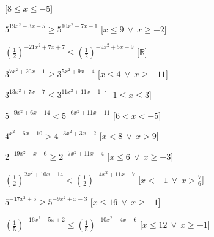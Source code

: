 \begin{esercizio}
\begin{enumeratea}
   \hfill [\(8 \leqslant x \leqslant -5\)]
  \item  \(5^{19 x^2 -3 x -5} \geqslant 5^{10 x^2 -7 x -1}\)
   \hfill [\(x \leqslant 9~\vee~x \geqslant -2\)]
  \item  \(\left(\frac{1}{2}\right)^{-21 x^2 +7 x +7} \leqslant 
\left(\frac{1}{2}\right)^{-9 x^2 +5 x +9}\)
   \hfill [\(\mathbb{R}\)]
  \item  \(3^{7 x^2 +20 x -1} \geqslant 3^{5 x^2 +9 x -4}\)
   \hfill [\(x \leqslant 4~\vee~x \geqslant -11\)]
  \item  \(3^{13 x^2 +7 x -7} \leqslant 3^{11 x^2 +11 x -1}\)
   \hfill [\(-1 \leqslant x \leqslant 3\)]
  \item  \(5^{-9 x^2 +6 x +14} < 5^{-6 x^2 +11 x +11}\)
   \hfill [\(6 < x < -5\)]
  \item  \(4^{x^2 -6 x -10} > 4^{-3 x^2 +3 x -2}\)
   \hfill [\(x < 8~\vee~x > 9\)]
  \item  \(2^{-19 x^2 - x +6} \geqslant 2^{-7 x^2 +11 x +4}\)
   \hfill [\(x \leqslant 6~\vee~x \geqslant -3\)]
  \item  \(\left(\frac{1}{2}\right)^{2 x^2 +10 x -14} < 
\left(\frac{1}{2}\right)^{-4 x^2 +11 x -7}\)
   \hfill [\(x < -1~\vee~x > \frac{7}{6}\)]
  \item  \(5^{-17 x^2 +5} \geqslant 5^{-9 x^2 + x -3}\)
   \hfill [\(x \leqslant 16~\vee~x \geqslant -1\)]
  \item  \(\left(\frac{1}{5}\right)^{-16 x^2 -5 x +2} \leqslant 
\left(\frac{1}{5}\right)^{-10 x^2 -4 x -6}\)
   \hfill [\(x \leqslant 12~\vee~x \geqslant -1\)]
 \end{enumeratea}
\end{esercizio}


